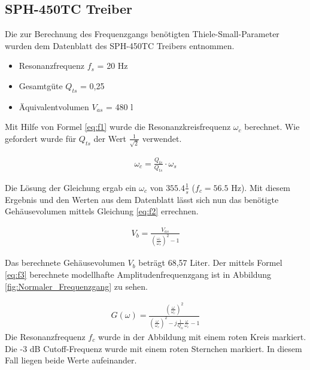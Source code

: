 \subsection{SPH-450TC Treiber}
\label{subsec:c}

Die zur Berechnung des Frequenzgangs benötigten Thiele-Small-Parameter wurden dem Datenblatt \cite{SPH-450TC} des SPH-450TC Treibers entnommen.

\begin{itemize}
  \item Resonanzfrequenz $f_s$ = 20 Hz
  \item Gesamtgüte $Q_{ts}$ = 0,25
  \item Äquivalentvolumen $V_{as}$ = 480 l
\end{itemize}

Mit Hilfe von Formel \ref{eq:f1} wurde die Resonanzkreisfrequenz $\omega_c$ berechnet.
Wie gefordert wurde für $Q_{ts}$ der Wert $\frac{1}{\sqrt{2}}$ verwendet.

\begin{align}
\label{eq:f1}
\omega_c = \frac{Q_{tc}}{Q_{ts}} \cdot \omega_s 
\end{align}

Die Lösung der Gleichung ergab ein $\omega_c$ von $355.4 \frac{1}{s}$ ($f_c = 56.5$ Hz). 
Mit diesem Ergebnis und den Werten aus dem Datenblatt lässt sich nun das benötigte Gehäusevolumen mittels Gleichung \ref{eq:f2} errechnen.

\begin{align}
\label{eq:f2}
V_b = \frac{V_{as}} {\left( \frac{\omega_c}{\omega_s} \right) ^{2} - 1}
\end{align}

Das berechnete Gehäusevolumen  $V_b$ beträgt 68,57 Liter.
Der mittels Formel \ref{eq:f3} berechnete modellhafte Amplitudenfrequenzgang ist in Abbildung \ref{fig:Normaler_Frequenzgang} zu sehen.

\begin{align}
\label{eq:f3}
G(\omega) = \frac{(\frac{\omega}{\omega_c})^2}{(\frac{\omega}{\omega_c})^2 - j \frac{1}{Q_{tc}}\frac{\omega}{\omega_c}-1}
\end{align}
Die Resonanzfrequenz $f_c$ wurde in der Abbildung mit einem roten Kreis markiert. 
Die -3 dB Cutoff-Frequenz wurde mit einem roten Sternchen markiert.
In diesem Fall liegen beide Werte aufeinander.

